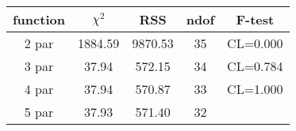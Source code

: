 \begin{tabular}{c|c|c|c|c}
function & $\chi^2$ & RSS & ndof & F-test \\
\hline
2 par & 1884.59 & 9870.53 & 35 & CL=0.000 \\
3 par & 37.94 & 572.15 & 34 & CL=0.784 \\
4 par & 37.94 & 570.87 & 33 & CL=1.000 \\
5 par & 37.93 & 571.40 & 32 & \\
\hline
\end{tabular}